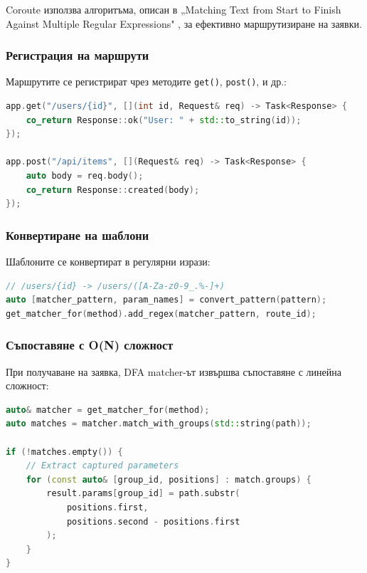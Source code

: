 Coroute използва алгоритъма, описан в „Matching Text from Start to Finish Against Multiple Regular Expressions" \cite{stankov2024regex}, за ефективно маршрутизиране на заявки.

\subsubsection{Регистрация на маршрути}

Маршрутите се регистрират чрез методите \texttt{get()}, \texttt{post()}, и др.:

\begin{lstlisting}[language=C++, basicstyle=\small\ttfamily, caption={Регистрация на маршрути}]
app.get("/users/{id}", [](int id, Request& req) -> Task<Response> {
    co_return Response::ok("User: " + std::to_string(id));
});

app.post("/api/items", [](Request& req) -> Task<Response> {
    auto body = req.body();
    co_return Response::created(body);
});
\end{lstlisting}

\subsubsection{Конвертиране на шаблони}

Шаблоните се конвертират в регулярни изрази:

\begin{lstlisting}[language=C++, basicstyle=\small\ttfamily, caption={Конвертиране на pattern към regex}]
// /users/{id} -> /users/([A-Za-z0-9_.%-]+)
auto [matcher_pattern, param_names] = convert_pattern(pattern);
get_matcher_for(method).add_regex(matcher_pattern, route_id);
\end{lstlisting}

\subsubsection{Съпоставяне с O(N) сложност}

При получаване на заявка, DFA matcher-ът извършва съпоставяне с линейна сложност:

\begin{lstlisting}[language=C++, basicstyle=\small\ttfamily, caption={DFA matching}]
auto& matcher = get_matcher_for(method);
auto matches = matcher.match_with_groups(std::string(path));

if (!matches.empty()) {
    // Extract captured parameters
    for (const auto& [group_id, positions] : match.groups) {
        result.params[group_id] = path.substr(
            positions.first, 
            positions.second - positions.first
        );
    }
}
\end{lstlisting}

